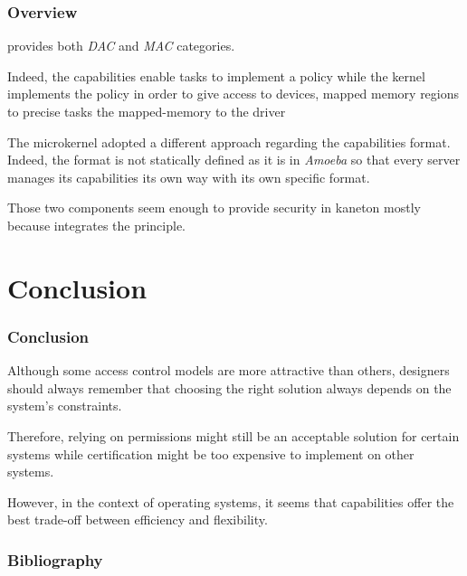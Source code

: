 
\begin{frame}
  \frametitle{Overview}

   provides both \textit{DAC} and \textit{MAC} categories.

  \-

  Indeed, the capabilities enable tasks to implement a  policy while
  the kernel implements the  policy in order to give access to
  devices, mapped memory regions \etc{} to precise tasks \eg{} the 
  mapped-memory to the  driver \etc{}

  \-

  The  microkernel adopted a different approach regarding the
  capabilities format. Indeed, the format is not statically defined as it is
  in \textit{Amoeba} so that every server manages its capabilities its own
  way with its own specific format.

  \-

  Those two components seem enough to provide security in kaneton mostly
  because  integrates the  principle.
\end{frame}

%
%

\section{Conclusion}


\begin{frame}
  \frametitle{Conclusion}

  Although some access control models are more attractive than others,
  designers should always remember that choosing the right solution always
  depends on the system's constraints.

  \-

  Therefore, relying on  permissions might still be an acceptable
  solution for certain systems while certification might be too expensive
  to implement on other systems.

  \-

  However, in the context of operating systems, it seems that capabilities
  offer the best trade-off between efficiency and flexibility.
\end{frame}

%
%

\begin{frame}
  \frametitle{Bibliography}

  
  
\end{frame}



